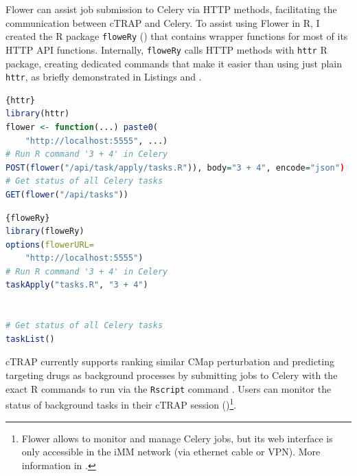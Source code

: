 Flower can assist job submission to Celery via HTTP methods, facilitating the communication between cTRAP and Celery. To assist using Flower in R, I created the R package \texttt{floweRy} () that contains wrapper functions for most of its HTTP API functions. Internally, \texttt{floweRy} calls HTTP methods with \texttt{httr} R package, creating dedicated commands that make it easier than using just plain \texttt{httr}, as briefly demonstrated in Listings  and .

\noindent\begin{minipage}{.48\textwidth}
\begin{lstlisting}[caption=Job submission with \texttt{httr}.,language=R,label={lst:httr}]{httr}
library(httr)
flower <- function(...) paste0(
    "http://localhost:5555", ...)
# Run R command '3 + 4' in Celery
POST(flower("/api/task/apply/tasks.R")), body="3 + 4", encode="json")
# Get status of all Celery tasks
GET(flower("/api/tasks"))
\end{lstlisting}
\end{minipage}\hfill
\begin{minipage}{.48\textwidth}
\begin{lstlisting}[caption=Job submission with \texttt{floweRy}.,language=R,label={lst:floweRy}]{floweRy}
library(floweRy)
options(flowerURL=
    "http://localhost:5555")
# Run R command '3 + 4' in Celery
taskApply("tasks.R", "3 + 4")


# Get status of all Celery tasks
taskList()
\end{lstlisting}
\end{minipage}

cTRAP currently supports ranking similar CMap perturbation and predicting targeting drugs as background processes by submitting jobs to Celery with the exact R commands to run via the \texttt{Rscript} command \cite{r-core-team:2021wf}. Users can monitor the status of background tasks in their cTRAP session ()\footnote{Flower allows to monitor and manage Celery jobs, but its web interface is only accessible in the iMM network (via ethernet cable or VPN). More information in .}.

